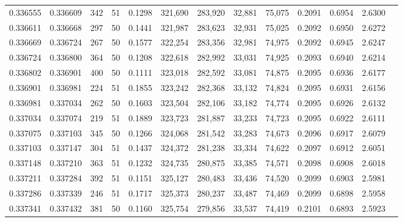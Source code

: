 \begin{tabular}{rrrrrrrrrrrrr}
0.336555 & 0.336609 &   342 &  51 &                                     0.1298 & 321,690 & 283,920 &  32,881 &  75,075 & 0.2091 & 0.6954 & 2.6300 \\
0.336611 & 0.336668 &   297 &  50 &                                     0.1441 & 321,987 & 283,623 &  32,931 &  75,025 & 0.2092 & 0.6950 & 2.6272 \\
0.336669 & 0.336724 &   267 &  50 &                                     0.1577 & 322,254 & 283,356 &  32,981 &  74,975 & 0.2092 & 0.6945 & 2.6247 \\
0.336724 & 0.336800 &   364 &  50 &                                     0.1208 & 322,618 & 282,992 &  33,031 &  74,925 & 0.2093 & 0.6940 & 2.6214 \\
0.336802 & 0.336901 &   400 &  50 &                                     0.1111 & 323,018 & 282,592 &  33,081 &  74,875 & 0.2095 & 0.6936 & 2.6177 \\
0.336901 & 0.336981 &   224 &  51 &                                     0.1855 & 323,242 & 282,368 &  33,132 &  74,824 & 0.2095 & 0.6931 & 2.6156 \\
0.336981 & 0.337034 &   262 &  50 &                                     0.1603 & 323,504 & 282,106 &  33,182 &  74,774 & 0.2095 & 0.6926 & 2.6132 \\
0.337034 & 0.337074 &   219 &  51 &                                     0.1889 & 323,723 & 281,887 &  33,233 &  74,723 & 0.2095 & 0.6922 & 2.6111 \\
0.337075 & 0.337103 &   345 &  50 &                                     0.1266 & 324,068 & 281,542 &  33,283 &  74,673 & 0.2096 & 0.6917 & 2.6079 \\
0.337103 & 0.337147 &   304 &  51 &                                     0.1437 & 324,372 & 281,238 &  33,334 &  74,622 & 0.2097 & 0.6912 & 2.6051 \\
0.337148 & 0.337210 &   363 &  51 &                                     0.1232 & 324,735 & 280,875 &  33,385 &  74,571 & 0.2098 & 0.6908 & 2.6018 \\
0.337211 & 0.337284 &   392 &  51 &                                     0.1151 & 325,127 & 280,483 &  33,436 &  74,520 & 0.2099 & 0.6903 & 2.5981 \\
0.337286 & 0.337339 &   246 &  51 &                                     0.1717 & 325,373 & 280,237 &  33,487 &  74,469 & 0.2099 & 0.6898 & 2.5958 \\
0.337341 & 0.337432 &   381 &  50 &                                     0.1160 & 325,754 & 279,856 &  33,537 &  74,419 & 0.2101 & 0.6893 & 2.5923 \\

\end{tabular}

